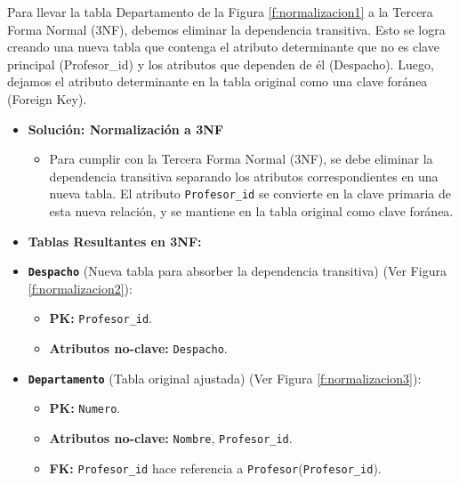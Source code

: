 Para llevar la tabla Departamento de la Figura \ref{f:normalizacion1} a la Tercera Forma Normal (3NF), debemos eliminar la dependencia transitiva. Esto se logra creando una nueva tabla que contenga el atributo determinante que no es clave principal (Profesor\_id) y los atributos que dependen de él (Despacho). Luego, dejamos el atributo determinante en la tabla original como una clave foránea (Foreign Key).
\begin{itemize}
    \item \textbf{Solución: Normalización a 3NF}
    \begin{itemize}
        \item Para cumplir con la Tercera Forma Normal (3NF), se debe eliminar la dependencia transitiva separando los atributos correspondientes en una nueva tabla. El atributo \texttt{Profesor\_id} se convierte en la clave primaria de esta nueva relación, y se mantiene en la tabla original como clave foránea.
    \end{itemize}

    \vspace{0.5cm}

    \item \textbf{Tablas Resultantes en 3NF:}

    \item \textbf{\texttt{Despacho}} (Nueva tabla para absorber la dependencia transitiva) (Ver Figura \ref{f:normalizacion2}):
    \begin{itemize}
        \item \textbf{PK:} \texttt{Profesor\_id}.
        \item \textbf{Atributos no-clave:} \texttt{Despacho}.
    \end{itemize}

    \item \textbf{\texttt{Departamento}} (Tabla original ajustada) (Ver Figura \ref{f:normalizacion3}):
    \begin{itemize}
        \item \textbf{PK:} \texttt{Numero}.
        \item \textbf{Atributos no-clave:} \texttt{Nombre}, \texttt{Profesor\_id}.
        \item \textbf{FK:} \texttt{Profesor\_id} hace referencia a \texttt{Profesor}(\texttt{Profesor\_id}).
    \end{itemize}


\end{itemize}
